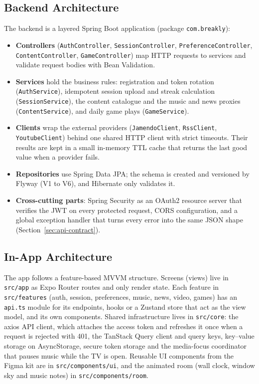 \subsection{Backend Architecture}
\label{sec:backend-architecture}

The backend is a layered Spring Boot application (package
\texttt{com.breakly}):
\begin{itemize}[leftmargin=1.8em,itemsep=2pt]
  \item \textbf{Controllers} (\texttt{AuthController}, \texttt{SessionController},
        \texttt{PreferenceController}, \texttt{ContentController},
        \texttt{GameController}) map HTTP requests to services and validate
        request bodies with Bean Validation.
  \item \textbf{Services} hold the business rules: registration and token
        rotation (\texttt{AuthService}), idempotent session upload and streak
        calculation (\texttt{SessionService}), the content catalogue and the
        music and news proxies (\texttt{ContentService}), and daily game plays
        (\texttt{GameService}).
  \item \textbf{Clients} wrap the external providers (\texttt{JamendoClient},
        \texttt{RssClient}, \texttt{YoutubeClient}) behind one shared HTTP client
        with strict timeouts. Their results are kept in a small in-memory TTL
        cache that returns the last good value when a provider fails.
  \item \textbf{Repositories} use Spring Data JPA; the schema is created and
        versioned by Flyway (V1 to V6), and Hibernate only validates it.
  \item \textbf{Cross-cutting parts}: Spring Security as an OAuth2 resource
        server that verifies the JWT on every protected request, CORS
        configuration, and a global exception handler that turns every error
        into the same JSON shape (Section~\ref{sec:api-contract}).
\end{itemize}

\subsection{In-App Architecture}
\label{sec:in-app-architecture}

The app follows a feature-based MVVM structure. Screens (views) live in
\texttt{src/app} as Expo Router routes and only render state. Each feature in
\texttt{src/features} (auth, session, preferences, music, news, video, games)
has an \texttt{api.ts} module for its endpoints, hooks or a Zustand store that
act as the view model, and its own components. Shared infrastructure lives in
\texttt{src/core}: the axios API client, which attaches the access token and
refreshes it once when a request is rejected with 401, the TanStack Query
client and query keys, key--value storage on AsyncStorage, secure token
storage and the media-focus coordinator that pauses music while the TV is
open. Reusable UI components from the Figma kit are in
\texttt{src/components/ui}, and the animated room (wall clock, window sky and
music notes) in \texttt{src/components/room}.

